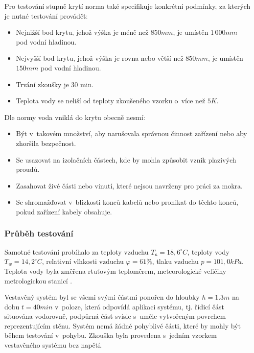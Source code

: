         Pro testování stupně krytí  norma také specifikuje konkrétní podmínky, za kterých je nutné testování provádět:
        \begin{itemize}
            \item Nejnižší bod krytu, jehož výška je méně než $850\unit{mm}$, je umístěn $1\,000\unit{mm}$ pod vodní hladinou.
            \item Nejvyšší bod krytu, jehož výška je rovna nebo větší než $850\unit{mm}$, je umístěn $150\unit{mm}$ pod vodní hladinou.
            \item Trvání zkoušky je 30 min.
            \item Teplota vody se neliší od teploty zkoušeného vzorku o~více než $5\unit{K}$.
        \end{itemize}

        Dle normy voda vniklá do krytu obecně nesmí:
        \begin{itemize}
            \item Být v~takovém množství, aby narušovala správnou činnost zařízení nebo aby zhoršila bezpečnost.
            \item Se usazovat na izolačních částech, kde by mohla způsobit vznik plazivých proudů.
            \item Zasahovat živé části nebo vinutí, které nejsou navrženy pro práci za mokra.
            \item Se shromažďovat v~blízkosti konců kabelů nebo pronikat do těchto konců, pokud zařízení kabely obsahuje.
        \end{itemize}

        \subsubsection{Průběh testování}
            Samotné testování probíhalo za teploty vzduchu $T_{a} = 18,6^\circ\unit{C}$, teploty vody $T_{w} = 14,2^\circ\unit{C}$, relativní vlhkosti vzduchu $\varphi = 61\unit{\%}$, tlaku vzduchu $p = 101,0\unit{kPa}$. Teplota vody byla změřena rtuťovým teploměrem, meteorologické veličiny metrologickou stanicí .

            Vestavěný systém byl se všemi svými částmi ponořen do hloubky $h = 1.3\unit{m}$ na dobu $t = 40\unit{min}$ v~poloze, která odpovídá aplikaci systému, tj. řídicí část situována vodorovně, podpůrná část svisle s~uměle vytvořeným povrchem reprezentujícím stěnu. Systém nemá žádné pohyblivé části, které by mohly být během testování v~pohybu. Zkouška byla provedena s~jedním vzorkem vestavěného systému bez napětí. 

